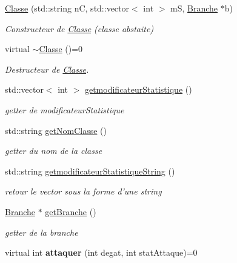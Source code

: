 \begin{DoxyCompactItemize}
\item 
\hyperlink{classClasse_a4fca4248505bd69ce2177ef2bdf351e9}{Classe} (std\-::string n\-C, std\-::vector$<$ int $>$ m\-S, \hyperlink{classBranche}{Branche} $\ast$b)
\begin{DoxyCompactList}\small\item\em Constructeur de \hyperlink{classClasse}{Classe} (classe abstaite) \end{DoxyCompactList}\item 
\hypertarget{classClasse_ad98e937acba69b9cfdbf7542c6a1a524}{virtual \hyperlink{classClasse_ad98e937acba69b9cfdbf7542c6a1a524}{$\sim$\-Classe} ()=0}\label{classClasse_ad98e937acba69b9cfdbf7542c6a1a524}

\begin{DoxyCompactList}\small\item\em Destructeur de \hyperlink{classClasse}{Classe}. \end{DoxyCompactList}\item 
std\-::vector$<$ int $>$ \hyperlink{classClasse_a8dfd239db27c6256d2fa36f3e38d66e6}{getmodificateur\-Statistique} ()
\begin{DoxyCompactList}\small\item\em getter de modificateur\-Statistique \end{DoxyCompactList}\item 
std\-::string \hyperlink{classClasse_a3a4ebe85619fe02a302bb8f45b81bc87}{get\-Nom\-Classe} ()
\begin{DoxyCompactList}\small\item\em getter du nom de la classe \end{DoxyCompactList}\item 
std\-::string \hyperlink{classClasse_a01e03d9170bbbf11e3392fe20d41e9a7}{getmodificateur\-Statistique\-String} ()
\begin{DoxyCompactList}\small\item\em retour le vector sous la forme d'une string \end{DoxyCompactList}\item 
\hyperlink{classBranche}{Branche} $\ast$ \hyperlink{classClasse_a1152773b9bd3130aef2fcbde7275021f}{get\-Branche} ()
\begin{DoxyCompactList}\small\item\em getter de la branche \end{DoxyCompactList}\item 
\hypertarget{classClasse_a95c668a4fc6e46680547ec3329729083}{virtual int {\bfseries attaquer} (int degat, int stat\-Attaque)=0}\label{classClasse_a95c668a4fc6e46680547ec3329729083}


\end{DoxyCompactItemize}
